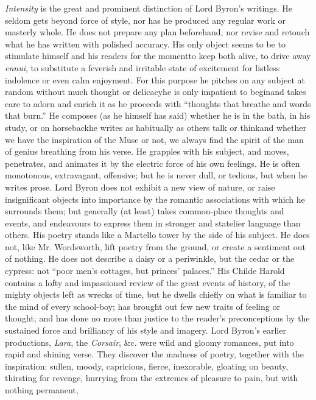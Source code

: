 \emph{Intensity} is the great and prominent distinction of Lord Byron's
writings. He seldom gets beyond force of style, nor has he produced any
regular work or masterly whole. He does not prepare any plan beforehand,
nor revise and retouch what he has written with polished accuracy. His
only object seems to be to stimulate himself and his readers for the
moment\textemdash to keep both alive, to drive away \emph{ennui}, to substitute a
feverish and irritable state of excitement for listless indolence or
even calm enjoyment. For this purpose he pitches on any subject at
random without much thought or delicacy\textemdash he is only impatient to
begin\textemdash and takes care to adorn and enrich it as he proceeds with
``thoughts that breathe and words that burn.'' He composes (as he himself
has said) whether he is in the bath, in his study, or on horseback\textemdash he
writes as habitually as others talk or think\textemdash and whether we have the
inspiration of the Muse or not, we always find the spirit of the man
of genius breathing from his verse. He grapples with his subject, and
moves, penetrates, and animates it by the electric force of his own
feelings. He is often monotonous, extravagant, offensive; but he is
never dull, or tedious, but when he writes prose. Lord Byron does not
exhibit a new view of nature, or raise insignificant objects into
importance by the romantic associations with which he surrounds them;
but generally (at least) takes common-place thoughts and events, and
endeavours to express them in stronger and statelier language than
others. His poetry stands like a Martello tower by the side of his
subject. He does not, like Mr. Wordsworth, lift poetry from the ground,
or create a sentiment out of nothing. He does not describe a daisy or a
periwinkle, but the cedar or the cypress: not ``poor men's cottages, but
princes' palaces.'' His Childe Harold contains a lofty and impassioned
review of the great events of history, of the mighty objects left as
wrecks of time, but he dwells chiefly on what is familiar to the mind of
every school-boy; has brought out few new traits of feeling or thought;
and has done no more than justice to the reader's preconceptions by the
sustained force and brilliancy of his style and imagery. Lord Byron's
earlier productions, \emph{Lara}, the \emph{Corsair}, \&c. were wild and gloomy
romances, put into rapid and shining verse. They discover the madness
of poetry, together with the inspiration: sullen, moody, capricious,
fierce, inexorable, gloating on beauty, thirsting for revenge, hurrying
from the extremes of pleasure to pain, but with nothing permanent,

